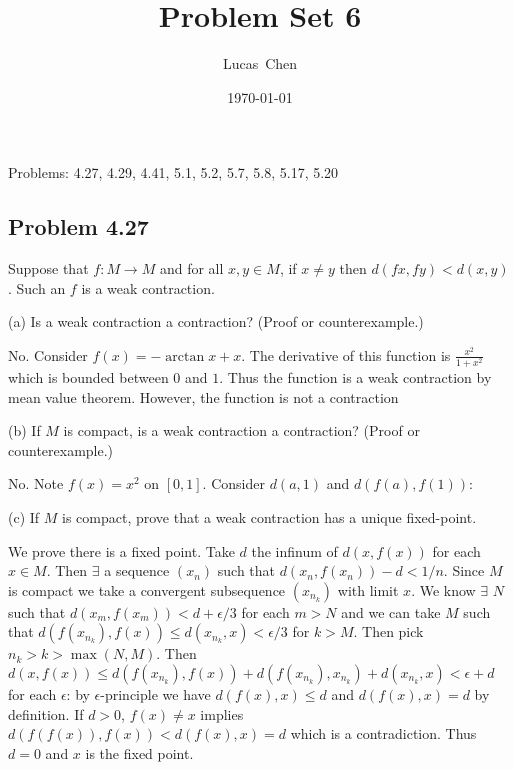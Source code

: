 \documentclass{amsart}
\title{Problem Set 6}
\author{Lucas\ Chen}
\date{\today}
\begin{document}
\maketitle

Problems: 4.27, 4.29, 4.41, 5.1, 5.2, 5.7, 5.8, 5.17, 5.20


















\subsection*{Problem 4.27} Suppose that \( f : M \rightarrow M \) and for all 
\( x, y \in M \), if \( x \neq y \) then \( d(fx, fy) < d(x, y) \). Such an \( f \) is a weak contraction.

(a) Is a weak contraction a contraction? (Proof or counterexample.)

\medskip \noindent No. Consider $f(x)=-\arctan{x} + x$. The derivative of this function
is $\frac{x^2}{1+x^2}$ which is bounded between $0$ and $1$. Thus the function is a weak contraction
by mean value theorem. However, the function is not a contraction 

\bigskip

(b) If \( M \) is compact, is a weak contraction a contraction? (Proof or counterexample.)

\medskip \noindent No. Note $f(x) = x^2$ on $[0, 1]$. Consider $d(a, 1)$ and $d(f(a), f(1))$: 

(c) If \( M \) is compact, prove that a weak contraction has a unique fixed-point.

\medskip \noindent We prove there is a fixed point. Take $d$ the infinum of $d(x, f(x))$ for each $x\in M$. Then $\exists$
a sequence $(x_n)$ such that $d(x_n, f(x_n))-d<1/n$. Since $M$ is compact we take a convergent
subsequence $(x_{n_k})$ with limit $x$. We know $\exists$ $N$ such that $d(x_m, f(x_m)) < d+\epsilon/3$ for each
$m>N$ and we can take $M$ such that $d(f(x_{n_k}), f(x))\leq d(x_{n_k}, x)<\epsilon/3$ for $k>M$. 
Then pick $n_k>k>\max(N, M)$. Then $d(x, f(x))\leq d(f(x_{n_k}), f(x))+ d(f(x_{n_k}), x_{n_k})+d(x_{n_k}, x)<\epsilon+d$
for each $\epsilon$: by $\epsilon$-principle we have $d(f(x), x)\leq d$ and $d(f(x), x)=d$ by definition.
If $d>0$, $f(x)\neq x$ implies $d(f(f(x)), f(x))<d(f(x), x)=d$ which is a contradiction. Thus $d=0$ and $x$
is the fixed point.
\end{document}
